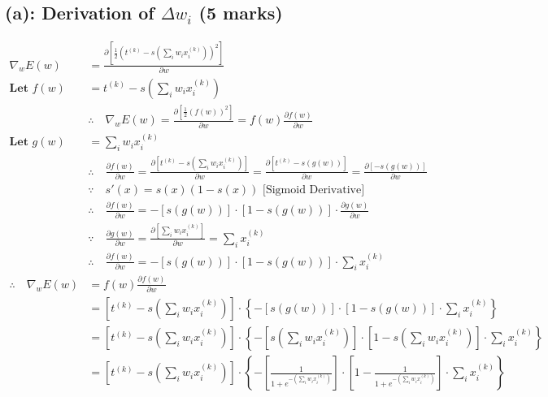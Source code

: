 \documentclass{tron}
\begin{document}
\subsection{(a): Derivation of $\Delta w_i$ (5 marks)}
{	
	\begin{align}
		\nabla_w E(w) 		& = \frac{\partial \left[ \frac12 \left( t^{(k)} - s(\sum_i w_i x_i^{(k)}) \right)^2 \right]}{\partial w}\\
		\textbf{Let } f(w) 	& = t^{(k)} - s(\sum_i w_i x_i^{(k)}) \\
							& \therefore \quad \nabla_w E(w) = \frac{\partial \left[ \frac12 \left( f(w) \right)^2 \right]}{\partial w} = f(w) \frac{\partial f(w)}{\partial w}\\
		\textbf{Let } g(w) & = \sum_i w_i x_i^{(k)} \\
							& \therefore \quad \frac{\partial f(w)}{\partial w} = \frac{\partial \left[t^{(k)} - s(\sum_i w_i x_i^{(k)})\right]}{\partial w} = \frac{\partial \left[t^{(k)} - s(g(w))\right]}{\partial w} = \frac{\partial \left[- s(g(w))\right]}{\partial w} \\
							& \because \quad s'(x) = s(x)(1 - s(x)) \text{ [Sigmoid Derivative]}\\
							& \therefore \quad \frac{\partial f(w)}{\partial w} = - \left[ s(g(w)) \right]\cdot\left[ 1 - s(g(w))\right] \cdot \frac{\partial g(w)}{\partial w}\\
							& \because \quad \frac{\partial g(w)}{\partial w} = \frac{\partial \left[  \sum_i w_i x_i^{(k)} \right]}{\partial w} =  \sum_i x_i^{(k)} \\
							& \therefore \quad \frac{\partial f(w)}{\partial w} = - \left[ s(g(w)) \right]\cdot\left[ 1 - s(g(w))\right] \cdot \sum_i x_i^{(k)}\\
		\therefore \quad \nabla_w E(w) 	&= f(w) \frac{\partial f(w)}{\partial w}\\
									   	&= \left[ t^{(k)} - s(\sum_i w_i x_i^{(k)}) \right] \cdot \left\{ - \left[ s(g(w)) \right]\cdot\left[ 1 - s(g(w))\right] \cdot \sum_i x_i^{(k)} \right\} \\
									   	&= \left[ t^{(k)} - s(\sum_i w_i x_i^{(k)}) \right] \cdot \left\{ - \left[ s(\sum_i w_i x_i^{(k)}) \right]\cdot\left[ 1 - s(\sum_i w_i x_i^{(k)})\right] \cdot \sum_i x_i^{(k)} \right\} \\
									   	&= \left[ t^{(k)} - s(\sum_i w_i x_i^{(k)}) \right] \cdot \left\{ - \left[ \frac1{1 + e^{- (\sum_i w_i x_i^{(k)})}} \right]\cdot\left[ 1 - \frac1{1 + e^{- (\sum_i w_i x_i^{(k)})}}\right] \cdot \sum_i x_i^{(k)} \right\} \\

\end{align}}
\end{document}
